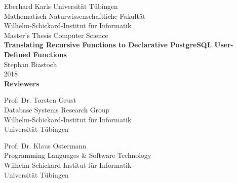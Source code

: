 \documentclass[twoside,10pt,a4paper]{report}
\begin{document}
\newcommand{\highlight}[2][yellow]{\mathchoice%
  {\colorbox{#1}{$\displaystyle#2$}}%
  {\colorbox{#1}{$\textstyle#2$}}%
  {\colorbox{#1}{$\scriptstyle#2$}}%
  {\colorbox{#1}{$\scriptscriptstyle#2$}}}%


 
\begin{titlepage}
 \begin{center}
  {\LARGE Eberhard Karls Universität Tübingen}\\
  {\large Mathematisch-Naturwissenschaftliche Fakultät \\
Wilhelm-Schickard-Institut für Informatik\\[4cm]}
  {\huge Master's Thesis Computer Science\\[2cm]}
  {\Large\bf Translating Recursive Functions to Declarative PostgreSQL User-Defined Functions\\[1.5cm]}
 {\large Stephan Biastoch}\\[0.5cm]
2018\\[4cm]
{\small\bf Reviewers}\\[0.5cm]
  \parbox{7cm}{\begin{center}{\large Prof. Dr. Torsten Grust}\\
  {\footnotesize Database Systems Research Group\\ Wilhelm-Schickard-Institut für Informatik\\%
	Universität Tübingen}\end{center}}\hfill\parbox{7cm}{\begin{center}
  {\large Prof. Dr. Klaus Ostermann}\\
  {\footnotesize Programming Languages \& Software Technology \\ Wilhelm-Schickard-Institut für Informatik\\%
	Universität Tübingen}\end{center}
 }
	

  \end{center}
\end{titlepage}
\end{document}
